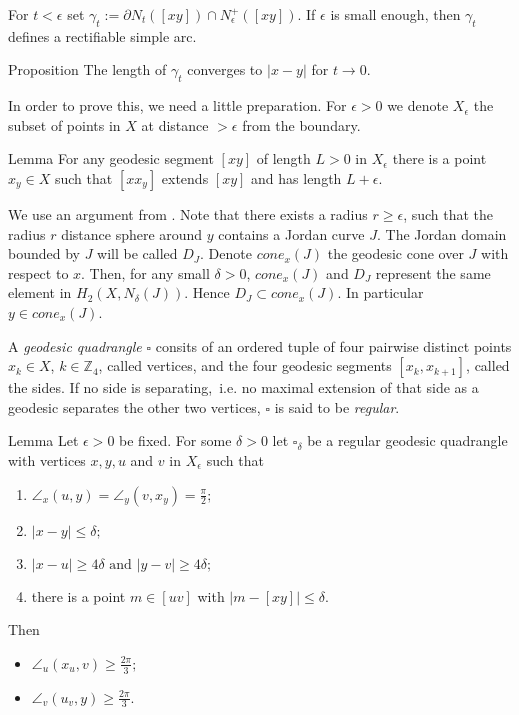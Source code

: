 \documentclass[a4paper,10pt]{amsart}
\begin{document}
For $t<\epsilon$ set $\gamma_t:=\partial N_t([xy])\cap N^+_\epsilon ([xy])$. If $\epsilon$
is small enough, then $\gamma_t$ defines a rectifiable simple arc.


\begin{thm}{Proposition}\label{prop:length continuity}
The length of $\gamma_t$ converges to $|x-y|$ for $t\to 0$.
\end{thm}

In order to prove this, we need a little preparation. For $\epsilon>0$ we denote
$X_\epsilon$ the subset of points in $X$ at distance $>\epsilon$ from the boundary.

\begin{thm}{Lemma}\label{lem:extension}
For any geodesic segment $[xy]$ of length $L>0$ in $X_\epsilon$ there is a point 
$x_y\in X$ such that $[x x_y]$ extends $[xy]$ and has length $L+\epsilon$.
\end{thm}
We use an argument from \cite{Kleiner}. Note that there exists a radius $r\geq\epsilon$, such 
that the radius $r$ distance sphere around $y$ contains a Jordan curve $J$. The Jordan domain bounded by $J$
will be called $D_J$.
Denote $cone_x(J)$ the geodesic cone over $J$ with respect to $x$. Then, 
for any small $\delta>0$, $cone_x(J)$ and $D_J$
represent the same element in $H_2(X,N_\delta(J))$. Hence $D_J\subset cone_x(J)$. 
In particular $y\in cone_x(J)$.
\qeds

A {\em geodesic quadrangle} $\square$ consits of an ordered tuple of four pairwise 
distinct points $x_k\in X$, $k\in\mathbb{Z}_4$, 
called vertices, and the four geodesic segments $[x_k,x_{k+1}]$, called the sides. 
If no side is separating,\ i.e. no maximal extension of that side as a geodesic 
separates the other two vertices, $\square$ is said to be {\em regular}.

\begin{thm}{Lemma}\label{lem:large angles}
Let $\epsilon>0$ be fixed. For some $\delta>0$ let $\square_\delta$ be a regular geodesic quadrangle with
vertices $x,y,u$ and $v$ in $X_\epsilon$ such that
\begin{enumerate}
	\item $\angle_x(u,y)=\angle_y(v,x_y)=\frac{\pi}{2};$
	\item $|x-y|\leq\delta;$
	\item $|x-u|\geq 4\delta\text{ and }|y-v|\geq 4\delta;$
	\item there is a point $m\in [uv]$ with $|m-[xy]|\leq \delta.$
\end{enumerate}
Then 
\begin{itemize}
\item $\angle_u(x_u,v)\geq\frac{2\pi}{3};$
\item $\angle_v(u_v,y)\geq\frac{2\pi}{3}.$
\end{itemize}
\end{thm}
\end{document}
